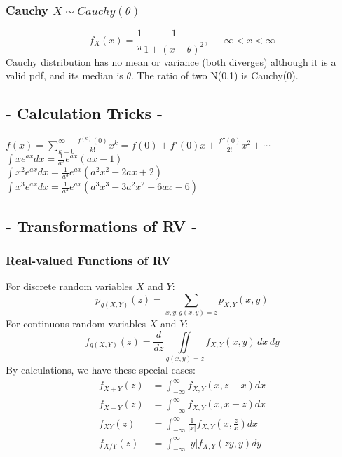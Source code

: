 \documentclass[a4paper,12pt]{article}
\begin{document}
\begin{multicols}{2}
\subsubsection*{Cauchy $X\sim Cauchy(\theta)$}
\[
f_X(x) = \frac{1}{\pi}\frac{1}{1+(x-\theta)^2}, \; -\infty < x < \infty
\]
Cauchy distribution has no mean or variance (both diverges) although it is a valid pdf, and its median is $\theta$. The ratio of two N(0,1) is Cauchy(0).

\subsection*{- Calculation Tricks -}
\(
f(x) = \sum_{k=0}^{\infty} \frac{f^{(k)}(0)}{k!}x^k = f(0) + f'(0)x + \frac{f''(0)}{2!}x^2 + \cdots
\)\\
\(
\int x e^{ax}dx = \frac{1}{a^2}e^{ax}(ax-1)
\)\\
\(
\int x^2 e^{ax}dx = \frac{1}{a^3}e^{ax}(a^2x^2-2ax+2)
\)\\
\(
\int x^3 e^{ax}dx = \frac{1}{a^4}e^{ax}(a^3x^3-3a^2x^2+6ax-6)
\)

\newpage

\subsection*{- Transformations of RV -}
\subsubsection*{Real-valued Functions of RV}
For discrete random variables $X$ and $Y$:
\[
p_{g(X,Y)}(z) = \sum_{x,y:g(x,y)=z}p_{X,Y}(x,y)
\]
For continuous random variables $X$ and $Y$:
\[
f_{g(X,Y)}(z) = \frac{d}{dz} \iint\limits_{g(x,y)=z} f_{X,Y}(x,y) \, dx \, dy
\]
By calculations, we have these special cases:
\begin{align*}
    f_{X+Y}(z) &= \int_{-\infty}^{\infty}f_{X,Y}(x,z-x)dx\\
    f_{X-Y}(z) &= \int_{-\infty}^{\infty}f_{X,Y}(x,x-z)dx\\
    f_{XY}(z) &= \int_{-\infty}^{\infty}\frac{1}{|x|}f_{X,Y}(x,\frac{z}{x})dx\\
    f_{X/Y}(z) &= \int_{-\infty}^{\infty}|y|f_{X,Y}(zy,y)dy
\end{align*}


\end{multicols}
\end{document}

